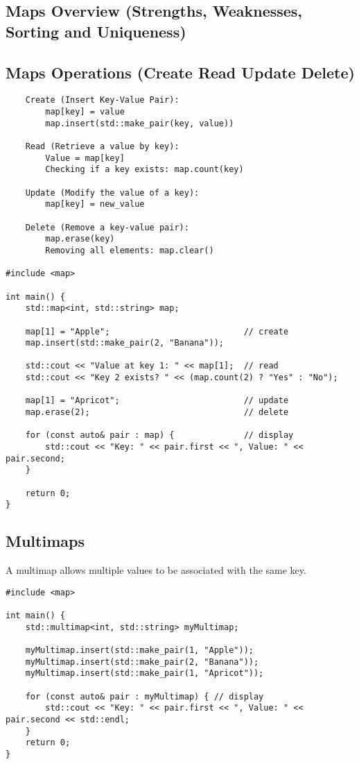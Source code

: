 \documentclass[openany]{report}
\begin{document}
 
\subsection{Maps Overview (Strengths, Weaknesses, Sorting and Uniqueness)}

\subsection{Maps Operations (Create Read Update Delete)}

\begin{verbatim}
    Create (Insert Key-Value Pair):
        map[key] = value 
        map.insert(std::make_pair(key, value))

    Read (Retrieve a value by key):
        Value = map[key]
        Checking if a key exists: map.count(key)

    Update (Modify the value of a key):
        map[key] = new_value

    Delete (Remove a key-value pair):
        map.erase(key)
        Removing all elements: map.clear()

#include <map>

int main() {
    std::map<int, std::string> map;

    map[1] = "Apple";                           // create
    map.insert(std::make_pair(2, "Banana"));

    std::cout << "Value at key 1: " << map[1];  // read
    std::cout << "Key 2 exists? " << (map.count(2) ? "Yes" : "No");

    map[1] = "Apricot";                         // update
    map.erase(2);                               // delete

    for (const auto& pair : map) {              // display
        std::cout << "Key: " << pair.first << ", Value: " << pair.second;
    }

    return 0;
}
\end{verbatim}

\subsection{Multimaps}

A multimap allows multiple values to be associated with the same key. 

\begin{verbatim}
#include <map>

int main() {
    std::multimap<int, std::string> myMultimap;

    myMultimap.insert(std::make_pair(1, "Apple"));
    myMultimap.insert(std::make_pair(2, "Banana"));
    myMultimap.insert(std::make_pair(1, "Apricot"));

    for (const auto& pair : myMultimap) { // display
        std::cout << "Key: " << pair.first << ", Value: " << pair.second << std::endl;
    }
    return 0;
}
\end{verbatim}
\end{document}
